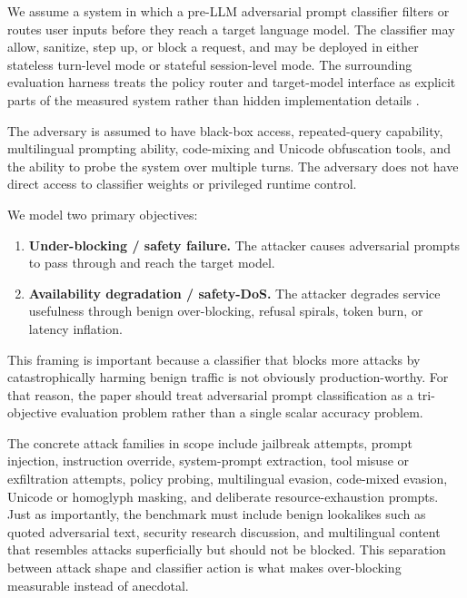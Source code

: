 We assume a system in which a pre-LLM adversarial prompt classifier filters or routes user inputs before they reach a target language model. The classifier may allow, sanitize, step up, or block a request, and may be deployed in either stateless turn-level mode or stateful session-level mode. The surrounding evaluation harness treats the policy router and target-model interface as explicit parts of the measured system rather than hidden implementation details \citep{shibbolethdraft2026}.

The adversary is assumed to have black-box access, repeated-query capability, multilingual prompting ability, code-mixing and Unicode obfuscation tools, and the ability to probe the system over multiple turns. The adversary does not have direct access to classifier weights or privileged runtime control.

We model two primary objectives:

\begin{enumerate}[leftmargin=1.5em]
  \item \textbf{Under-blocking / safety failure.} The attacker causes adversarial prompts to pass through and reach the target model.
  \item \textbf{Availability degradation / safety-DoS.} The attacker degrades service usefulness through benign over-blocking, refusal spirals, token burn, or latency inflation.
\end{enumerate}

This framing is important because a classifier that blocks more attacks by catastrophically harming benign traffic is not obviously production-worthy. For that reason, the paper should treat adversarial prompt classification as a tri-objective evaluation problem rather than a single scalar accuracy problem.

The concrete attack families in scope include jailbreak attempts, prompt injection, instruction override, system-prompt extraction, tool misuse or exfiltration attempts, policy probing, multilingual evasion, code-mixed evasion, Unicode or homoglyph masking, and deliberate resource-exhaustion prompts. Just as importantly, the benchmark must include benign lookalikes such as quoted adversarial text, security research discussion, and multilingual content that resembles attacks superficially but should not be blocked. This separation between attack shape and classifier action is what makes over-blocking measurable instead of anecdotal.

